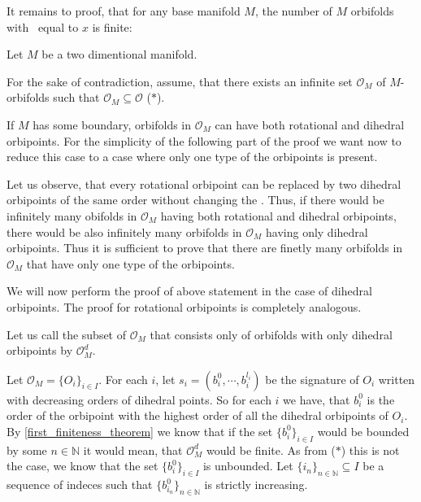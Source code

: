 It remains to proof, that for any base manifold $M$, the number of $M$ orbifolds 
with \Eoc\ equal to $x$ is finite: 

Let $M$ be a two dimentional manifold. 

For the sake of contradiction, assume, that there exists an infinite set $\mathcal{O}_M$
of $M$-orbifolds such that $\mathcal{O}_M \subseteq \mathcal{O}$ ($\ast$).

If $M$ has some boundary, orbifolds in $\mathcal{O}_M$ 
can have both rotational and dihedral orbipoints. 
For the simplicity of the following part of the proof we want now to reduce this case 
to a case 
where only one type of the orbipoints is present. 

Let us observe, that every rotational orbipoint can be replaced by two dihedral orbipoints 
of the same order without changing the \Eoc. Thus, if there would be infinitely many 
obifolds in $\mathcal{O}_M$ having both rotational and dihedral orbipoints, there would be 
also infinitely many orbifolds in $\mathcal{O}_M$ having only dihedral orbipoints. 
Thus it is sufficient to prove that there are finetly many orbifolds in $\mathcal{O}_M$ 
that have only one type of the orbipoints. 

We will now perform the proof of above statement in the case of dihedral orbipoints.
The proof for rotational orbipoints is completely analogous. 

Let us call the subset of $\mathcal{O}_M$ 
that consists only of orbifolds with only dihedral orbipoints by $\mathcal{O}_M^d$.

Let $\mathcal{O}_M = \{O_i\}_{i \in I}$. 
For each $i$, let $s_i = (b^0_i, \cdots, b^{l_i}_i)$ be the signature 
of $O_i$ written with decreasing orders of 
dihedral points. So for each $i$ we have, that $b^0_i$ is 
the order of the orbipoint with the highest order of all the dihedral orbipoints of 
$O_i$. 
By \ref{first_finiteness_theorem} we know that if the set $\{b^0_i\}_{i \in I}$ 
would be bounded 
by some $n \in \mathbb{N}$ it would mean, that $\mathcal{O}_M^d$ would be finite. As 
from ($\ast$) this is not the case, we know
that the set $\{b^0_i\}_{i \in I}$ is unbounded. 
Let $\{i_n\}_{n\in \mathbb{N}} \subseteq I$ be a sequence of indeces such that
$\{b^0_{i_n}\}_{n\in \mathbb{N}}$ is strictly increasing. 

